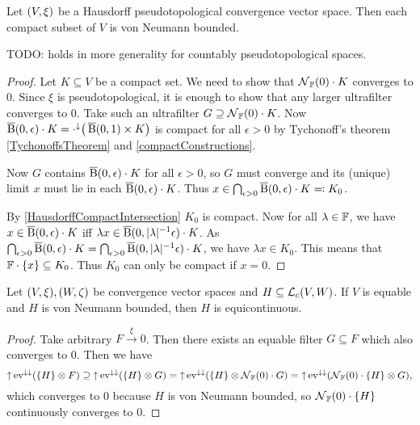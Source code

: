 \begin{proposition} \label{compactSubsetsVonNeumannBounded}
Let $\sSet{V,\xi}$ be a Hausdorff pseudotopological convergence vector space. Then each compact subset of $V$ is von Neumann bounded.
\end{proposition}
TODO: holds in more generality for countably pseudotopological spaces.
\begin{proof}
Let $K\subseteq V$ be a compact set. We need to show that $\operatorname{\mathcal{N}}_{\mathbb{F}}(0)\cdot K$ converges to $0$. Since $\xi$ is pseudotopological, it is enough to show that any larger ultrafilter converges to $0$. Take such an ultrafilter $G\supseteq \operatorname{\mathcal{N}}_{\mathbb{F}}(0)\cdot K$. Now $\operatorname{\overline{B}}(0,\epsilon)\cdot K = \cdot^{\downarrow}\big(\operatorname{\overline{B}}(0,1)\times K\big)$ is compact for all $\epsilon > 0$ by Tychonoff's theorem \ref{TychonoffsTheorem} and \ref{compactConstructions}.

Now $G$ contains $\operatorname{\overline{B}}(0,\epsilon)\cdot K$ for all $\epsilon > 0$, so $G$ must converge and its (unique) limit $x$ must lie in each $\operatorname{\overline{B}}(0,\epsilon)\cdot K$. Thus $x\in \bigcap_{\epsilon>0}\operatorname{\overline{B}}(0,\epsilon)\cdot K \eqqcolon K_0$.

By \ref{HausdorffCompactIntersection} $K_0$ is compact. Now 
for all $\lambda\in \mathbb{F}$, we have $x\in \operatorname{\overline{B}}(0,\epsilon)\cdot K$ iff $\lambda x \in\operatorname{\overline{B}}(0,|\lambda|^{-1}\epsilon)\cdot K$. As $\bigcap_{\epsilon>0}\operatorname{\overline{B}}(0,\epsilon)\cdot K = \bigcap_{\epsilon>0}\operatorname{\overline{B}}(0,|\lambda|^{-1}\epsilon)\cdot K$, we have $\lambda x\in K_0$. This means that $\mathbb{F}\cdot \{x\} \subseteq K_0$. Thus $K_0$ can only be compact if $x=0$.
\end{proof}

\begin{lemma} \label{vonNeumannBoundedImpliesEquicontinuous}
Let $\sSet{V,\xi}, \sSet{W,\zeta}$ be convergence vector spaces and $H\subseteq \operatorname{\mathcal{L}}_c(V, W)$. If $V$ is equable and $H$ is von Neumann bounded, then $H$ is equicontinuous.
\end{lemma}
\begin{proof}
Take arbitrary $F\overset{\xi}{\longrightarrow} 0$. Then there exists an equable filter $G\subseteq F$ which also converges to $0$. Then we have
\[ \operatorname{\uparrow} \operatorname{ev}^{\downarrow\downarrow}(\{H\}\otimes F) \supseteq \operatorname{\uparrow} \operatorname{ev}^{\downarrow\downarrow}(\{H\}\otimes G) = \operatorname{\uparrow} \operatorname{ev}^{\downarrow\downarrow}(\{H\}\otimes \operatorname{\mathcal{N}}_{\mathbb{F}}(0)\cdot G) = \operatorname{\uparrow} \operatorname{ev}^{\downarrow\downarrow}(\operatorname{\mathcal{N}}_{\mathbb{F}}(0)\cdot \{H\}\otimes G), \]
which converges to $0$ because $H$ is von Neumann bounded, so $\operatorname{\mathcal{N}}_{\mathbb{F}}(0)\cdot \{H\}$ continuously converges to $0$.
\end{proof}

